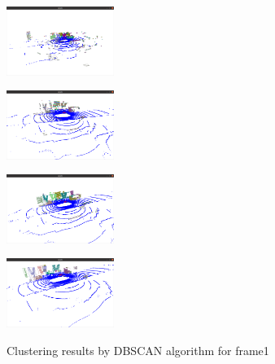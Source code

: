 \documentclass[10pt]{article}
\theoremstyle{nonumberplain}
\begin{document}
\begin{figure}[H]
	\centering
	\begin{minipage}[t]{0.24\textwidth}
		\centering
		\includegraphics[width=3.5cm]{fig3a.png}
		\label{fig3a}
	\end{minipage}
	\begin{minipage}[t]{0.24\textwidth}
		\centering
		\includegraphics[width=3.5cm]{fig3b.png}
		\label{fig3b}
	\end{minipage}
	\begin{minipage}[t]{0.24\textwidth}
		\centering
		\includegraphics[width=3.5cm]{fig3c.png}
		\label{fig3c}
	\end{minipage}
	\begin{minipage}[t]{0.24\textwidth}
		\centering
		\includegraphics[width=3.5cm]{fig3d.png}
		\label{fig3d}
	\end{minipage}
	\caption{Clustering results by DBSCAN algorithm for frame1}
	\label{fig3}
\end{figure} 
\end{document}
